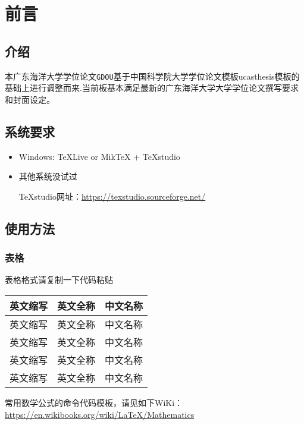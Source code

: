 
\chapter{前言}
\label{chap:guide}

\section{介绍}

本广东海洋大学学位论文\texttt{GDOU}基于中国科学院大学学位论文模板ucasthesis模板的基础上进行调整而来.当前板基本满足最新的广东海洋大学大学学位论文撰写要求和封面设定。

\section{系统要求}
\begin{itemize}
	\item Windows: \TeX{}Live or Mik\TeX{}  + TeXstudio
	\item 其他系统没试过
	
	TeXstudio网址：\url{https://texstudio.sourceforge.net/}
\end{itemize}

\section{使用方法}
\subsection{表格}
表格格式请复制一下代码粘贴

\begin{table}[!h]
	\centering
	\footnotesize%
	\setlength{\tabcolsep}{5pt}%
	\renewcommand{\arraystretch}{1.2}%
	\begin{tabular}{ccc}
		\toprule[1.5pt]%
		英文缩写 &英文全称  &中文名称 \\ \hline
		英文缩写 &英文全称  &中文名称\\
		英文缩写 &英文全称  &中文名称\\
		英文缩写 &英文全称  &中文名称\\
		英文缩写 &英文全称  &中文名称\\
		\bottomrule [1.5pt]%
	\end{tabular}
	\label{tab:shiji}
\end{table}
常用数学公式的命令代码模板，请见如下WiKi：\url{https://en.wikibooks.org/wiki/LaTeX/Mathematics}

